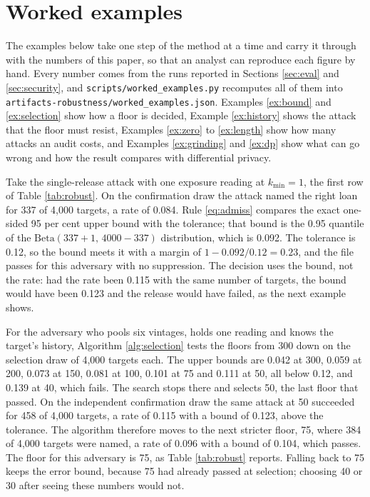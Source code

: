\section{Worked examples}\label{sec:worked}

The examples below take one step of the method at a time and carry it through
with the numbers of this paper, so that an analyst can reproduce each figure by
hand. Every number comes from the runs reported in Sections \ref{sec:eval} and
\ref{sec:security}, and \nolinkurl{scripts/worked_examples.py} recomputes all of
them into \nolinkurl{artifacts-robustness/worked_examples.json}.
Examples \ref{ex:bound} and \ref{ex:selection} show how a floor is decided,
Example \ref{ex:history} shows the attack that the floor must resist, Examples
\ref{ex:zero} to \ref{ex:length} show how many attacks an audit costs, and
Examples \ref{ex:grinding} and \ref{ex:dp} show what can go wrong and how the
result compares with differential privacy.

\begin{example}\label{ex:bound}
Take the single-release attack with one exposure reading at $k_{\min} = 1$, the
first row of Table \ref{tab:robust}. On the confirmation draw the attack named
the right loan for 337 of 4{,}000 targets, a rate of 0.084. Rule \eqref{eq:admiss}
compares the exact one-sided 95 per cent upper bound with the tolerance; that
bound is the 0.95 quantile of the $\mathrm{Beta}(337+1,\,4000-337)$
distribution, which is 0.092. The tolerance is
0.12, so the bound meets it with a margin of $1 - 0.092/0.12 = 0.23$, and the
file passes for this adversary with no suppression. The decision uses the bound,
not the rate: had the rate been 0.115 with the same number of targets, the bound
would have been 0.123 and the release would have failed, as the next example shows.
\end{example}

\begin{example}\label{ex:selection}
For the adversary who pools six vintages, holds one reading and knows the
target's history, Algorithm \ref{alg:selection} tests the floors from 300 down on
the selection draw of 4{,}000 targets each. The upper bounds are 0.042 at 300,
0.059 at 200, 0.073 at 150, 0.081 at 100, 0.101 at 75 and 0.111 at 50, all below
0.12, and 0.139 at 40, which fails. The search stops there and selects 50, the
last floor that passed. On the independent confirmation draw the same attack at
50 succeeded for 458 of 4{,}000 targets, a rate of 0.115 with a bound of 0.123,
above the tolerance. The algorithm therefore moves to the next stricter floor,
75, where 384 of 4{,}000 targets were named, a rate of 0.096 with a bound of
0.104, which passes. The floor for this adversary is 75, as Table
\ref{tab:robust} reports. Falling back to 75 keeps the error bound, because 75
had already passed at selection; choosing 40 or 30 after seeing these numbers
would not.
\end{example}

